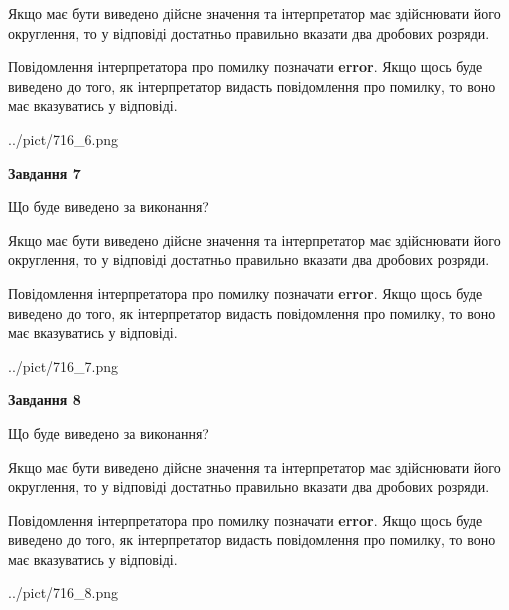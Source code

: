 \documentclass[12pt, ukrainian]{article}
\begin{document}
{\begin {Large}
Якщо має бути виведено дійсне значення та інтерпретатор має здійснювати його округлення, 
то у відповіді достатньо правильно вказати два дробових розряди.

Повідомлення інтерпретатора про помилку позначати \textbf{error}.
Якщо щось буде виведено до того, як інтерпретатор видасть повідомлення про помилку, 
то воно має вказуватись у відповіді. \par

\begin{center}
	{../pict/716_6.png}
\end{center}
\newpage

{\begin {center}\textbf{Завдання 7}\end {center}}\par
Що буде виведено за виконання? \par

Якщо має бути виведено дійсне значення та інтерпретатор має здійснювати його округлення, 
то у відповіді достатньо правильно вказати два дробових розряди.

Повідомлення інтерпретатора про помилку позначати \textbf{error}.
Якщо щось буде виведено до того, як інтерпретатор видасть повідомлення про помилку, 
то воно має вказуватись у відповіді. \par

\begin{center}
	{../pict/716_7.png}
\end{center}
\newpage

{\begin {center}\textbf{Завдання 8}\end {center}}\par
Що буде виведено за виконання? \par

Якщо має бути виведено дійсне значення та інтерпретатор має здійснювати його округлення, 
то у відповіді достатньо правильно вказати два дробових розряди.

Повідомлення інтерпретатора про помилку позначати \textbf{error}.
Якщо щось буде виведено до того, як інтерпретатор видасть повідомлення про помилку, 
то воно має вказуватись у відповіді. \par

\begin{center}
	{../pict/716_8.png}
\end{center}
\newpage


\end{Large}}
\end{document}
